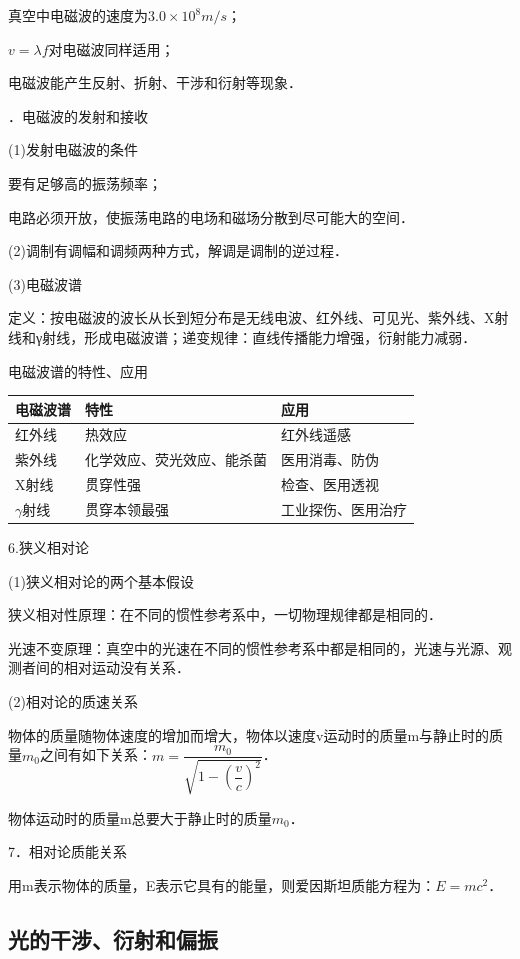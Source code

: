 真空中电磁波的速度为$3.0\times 10^8m/s$；

$v=\lambda f$对电磁波同样适用；

电磁波能产生反射、折射、干涉和衍射等现象．

．电磁波的发射和接收

(1)发射电磁波的条件

要有足够高的振荡频率；

电路必须开放，使振荡电路的电场和磁场分散到尽可能大的空间．

(2)调制有调幅和调频两种方式，解调是调制的逆过程．

(3)电磁波谱

定义：按电磁波的波长从长到短分布是无线电波、红外线、可见光、紫外线、X射线和γ射线，形成电磁波谱；递变规律：直线传播能力增强，衍射能力减弱．

电磁波谱的特性、应用

\begin{longtable}[]{@{}m{1.5cm}m{5cm}m{3.5cm}@{}}
\toprule
电磁波谱 & 特性 & 应用\tabularnewline
\midrule
\endhead
红外线 & 热效应 & 红外线遥感\tabularnewline

紫外线&
化学效应、荧光效应、能杀菌
&
医用消毒、防伪\tabularnewline
X射线 & 贯穿性强 & 检查、医用透视\tabularnewline
$\gamma$射线 & 贯穿本领最强 & 工业探伤、医用治疗\tabularnewline
\bottomrule
\end{longtable}

6.狭义相对论

(1)狭义相对论的两个基本假设

狭义相对性原理：在不同的惯性参考系中，一切物理规律都是相同的．

光速不变原理：真空中的光速在不同的惯性参考系中都是相同的，光速与光源、观测者间的相对运动没有关系．

(2)相对论的质速关系

物体的质量随物体速度的增加而增大，物体以速度v运动时的质量m与静止时的质量$m_0$之间有如下关系：$m=\dfrac{m_0}{\sqrt{1-(\dfrac{v}{c})^2}}$．

物体运动时的质量m总要大于静止时的质量$m_0$．

7．相对论质能关系

用m表示物体的质量，E表示它具有的能量，则爱因斯坦质能方程为：$E=mc^2$．
\newpage
\subsection{光的干涉、衍射和偏振}

